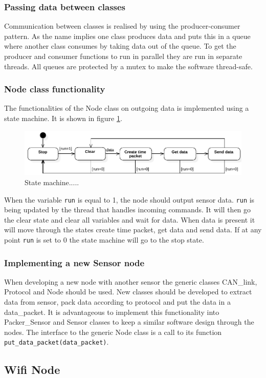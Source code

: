 \subsubsection*{Passing data between classes}
Communication between classes is realised by using the producer-consumer pattern.
As the name implies one class produces data and puts this in a queue where another class consumes by taking data out of the queue.
To get the producer and consumer functions to run in parallel they are run in separate threads.
All queues are protected by a mutex to make the software thread-safe.

\subsubsection*{Node class functionality}
The functionalities of the Node class on outgoing data is implemented using a state machine.
It is shown in figure \ref{fig:state_machine}.
\begin{figure}[!h]
\centering
\includegraphics[width=1\textwidth]{graphics/StateDiagram_Node.pdf}
\caption{State machine.....}
\label{fig:state_machine}
\end{figure}
When the variable \texttt{run} is equal to 1, the node should output sensor data.
\texttt{run} is being updated by the thread that handles incoming commands.
It will then go the clear state and clear all variables and wait for data. 
When data is present it will move through the states create time packet, get data and send data. 
If at any point \texttt{run} is set to 0 the state machine will go to the stop state.


\subsubsection*{Implementing a new Sensor node}
When developing a new node with another sensor the generic classes CAN\_link, Protocol and Node should be used. 
New classes should be developed to extract data from sensor, pack data according to protocol and put the data in a data\_packet.
It is advantageous to implement this functionality into Packer\_Sensor and Sensor classes to keep a similar software design through the nodes.
The interface to the generic Node class is a call to its function \texttt{put\_data\_packet(data\_packet)}.

\subsection{Wifi Node}

